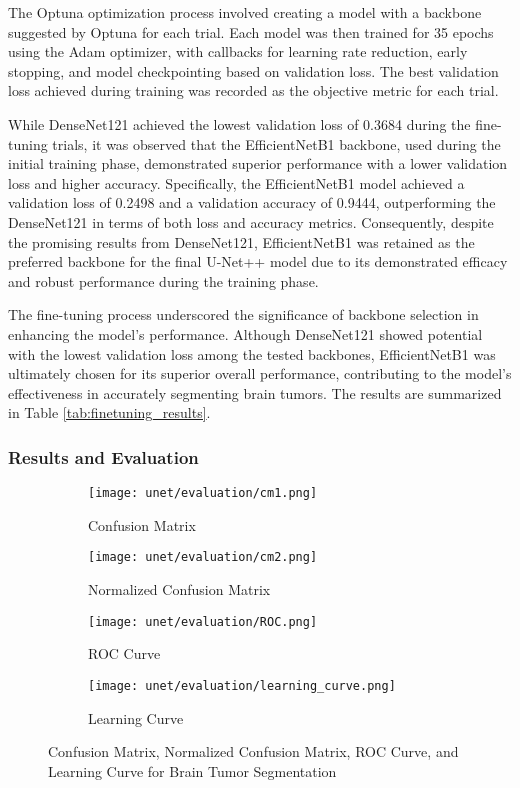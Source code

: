 The Optuna optimization process involved creating a model with a backbone suggested by Optuna for each trial. Each model was then trained for 35 epochs using the Adam optimizer, with callbacks for learning rate reduction, early stopping, and model checkpointing based on validation loss. The best validation loss achieved during training was recorded as the objective metric for each trial.

While DenseNet121 achieved the lowest validation loss of 0.3684 during the fine-tuning trials, it was observed that the EfficientNetB1 backbone, used during the initial training phase, demonstrated superior performance with a lower validation loss and higher accuracy. Specifically, the EfficientNetB1 model achieved a validation loss of 0.2498 and a validation accuracy of 0.9444, outperforming the DenseNet121 in terms of both loss and accuracy metrics. Consequently, despite the promising results from DenseNet121, EfficientNetB1 was retained as the preferred backbone for the final U-Net++ model due to its demonstrated efficacy and robust performance during the training phase.

The fine-tuning process underscored the significance of backbone selection in enhancing the model's performance. Although DenseNet121 showed potential with the lowest validation loss among the tested backbones, EfficientNetB1 was ultimately chosen for its superior overall performance, contributing to the model's effectiveness in accurately segmenting brain tumors. The results are summarized in Table \ref{tab:finetuning_results}.

\subsubsection{Results and Evaluation}

\begin{figure}[H]
  \centering
  \begin{subfigure}[b]{0.2\textwidth}
    \centering
    \texttt{[image: unet/evaluation/cm1.png]}
    \caption{Confusion Matrix}
    \label{fig:unet_cm1}
  \end{subfigure}
  \hfill
  \begin{subfigure}[b]{0.2\textwidth}
    \centering
    \texttt{[image: unet/evaluation/cm2.png]}
    \caption{Normalized Confusion Matrix}
    \label{fig:unet_cm2}
  \end{subfigure}
  \hfill
  \begin{subfigure}[b]{0.25\textwidth}
    \centering
    \texttt{[image: unet/evaluation/ROC.png]}
    \caption{ROC Curve}
    \label{fig:unet_roc}
  \end{subfigure}
  \hfill
  \begin{subfigure}[b]{0.25\textwidth}
    \centering
    \texttt{[image: unet/evaluation/learning\_curve.png]}
    \caption{Learning Curve}
    \label{fig:unet_learning_curve}
  \end{subfigure}
  \caption{Confusion Matrix, Normalized Confusion Matrix, ROC Curve, and Learning Curve for Brain Tumor Segmentation}
  \label{fig:unet_evaluation}
\end{figure}

